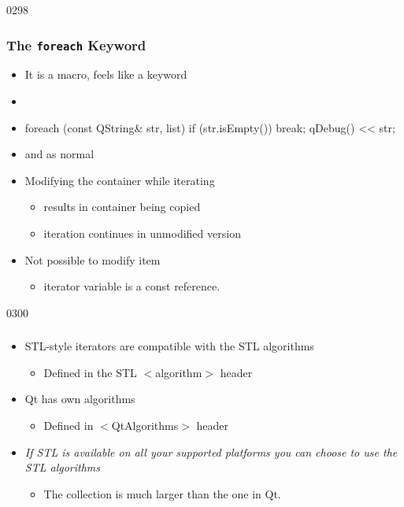 \begin{slide}[fragile]{0298}\frametitle{The \texttt{foreach} Keyword}
\begin{itemize}
  \item It is a macro, feels like a keyword
  \item[]   
  \item[] \begin{cpp}
foreach (const QString& str, list) {
  if (str.isEmpty())
    break;
  qDebug() << str;
}    
  \end{cpp}
  \item {} and  as normal
  \item Modifying the container while iterating
  \begin{itemize}
  	\item results in container being copied
  	\item iteration continues in unmodified version
  \end{itemize}
  \item Not possible to modify item
  \begin{itemize}
  	\item iterator variable is a const reference.
  \end{itemize}
\end{itemize}
\end{slide}

\begin{slide}{0300}\frametitle{}
\begin{itemize}
  \item STL-style iterators are compatible with the STL algorithms
  \begin{itemize}
    \item Defined in the STL $<$algorithm$>$ header
  \end{itemize}
  \item Qt has own algorithms
  \begin{itemize}
    \item Defined in $<$QtAlgorithms$>$ header
  \end{itemize}
  \item \emph{If STL is available on all your supported platforms you can
      choose to use the STL algorithms}
  \begin{itemize}
    \item The collection is much larger than the one in Qt.
  \end{itemize}
\end{itemize}
\end{slide}


